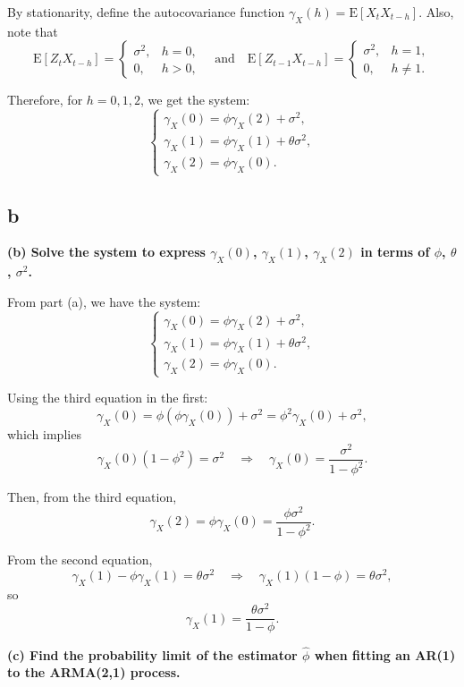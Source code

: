\documentclass{article}
\begin{document}
By stationarity, define the autocovariance function \(\gamma_X(h) = \mathrm{E}[X_t X_{t-h}]\). Also, note that
\[
\mathrm{E}[Z_t X_{t-h}] =
\begin{cases}
\sigma^2, & h=0, \\
0, & h > 0,
\end{cases}
\quad \text{and} \quad
\mathrm{E}[Z_{t-1} X_{t-h}] =
\begin{cases}
\sigma^2, & h=1, \\
0, & h \neq 1.
\end{cases}
\]

Therefore, for \(h=0,1,2\), we get the system:
\[
\begin{cases}
\gamma_X(0) = \phi \gamma_X(2) + \sigma^2, \\
\gamma_X(1) = \phi \gamma_X(1) + \theta \sigma^2, \\
\gamma_X(2) = \phi \gamma_X(0).
\end{cases}
\]
\subsection{b}
\textbf{(b) Solve the system to express \(\gamma_X(0)\), \(\gamma_X(1)\), \(\gamma_X(2)\) in terms of \(\phi\), \(\theta\), \(\sigma^2\).}

\medskip

From part (a), we have the system:
\[
\begin{cases}
\gamma_X(0) = \phi \gamma_X(2) + \sigma^2, \\
\gamma_X(1) = \phi \gamma_X(1) + \theta \sigma^2, \\
\gamma_X(2) = \phi \gamma_X(0).
\end{cases}
\]

Using the third equation in the first:
\[
\gamma_X(0) = \phi (\phi \gamma_X(0)) + \sigma^2 = \phi^2 \gamma_X(0) + \sigma^2,
\]
which implies
\[
\gamma_X(0)(1 - \phi^2) = \sigma^2 \quad \Rightarrow \quad \boxed{\gamma_X(0) = \frac{\sigma^2}{1 - \phi^2}}.
\]

Then, from the third equation,
\[
\gamma_X(2) = \phi \gamma_X(0) = \frac{\phi \sigma^2}{1 - \phi^2}.
\]

From the second equation,
\[
\gamma_X(1) - \phi \gamma_X(1) = \theta \sigma^2 \quad \Rightarrow \quad \gamma_X(1)(1 - \phi) = \theta \sigma^2,
\]
so
\[
\boxed{
\gamma_X(1) = \frac{\theta \sigma^2}{1 - \phi}.
}
\]

\bigskip

\textbf{(c) Find the probability limit of the estimator \(\hat{\phi}\) when fitting an AR(1) to the ARMA(2,1) process.}
\end{document}
